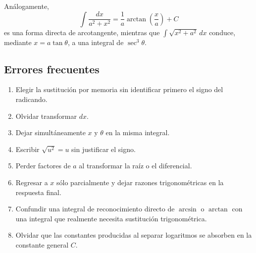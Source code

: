 \documentclass[12pt]{article}
\theoremstyle{definition}
\theoremstyle{remark}
\begin{document}
Análogamente,
\[
\int\frac{dx}{a^2+x^2}
=\frac1a\arctan\left(\frac{x}{a}\right)+C
\]
es una forma directa de arcotangente, mientras que $\int\sqrt{x^2+a^2}\,dx$ conduce, mediante $x=a\tan\theta$, a una integral de $\sec^3\theta$.

\subsection*{Errores frecuentes}

\begin{enumerate}
\item Elegir la sustitución por memoria sin identificar primero el signo del radicando.
\item Olvidar transformar $dx$.
\item Dejar simultáneamente $x$ y $\theta$ en la misma integral.
\item Escribir $\sqrt{u^2}=u$ sin justificar el signo.
\item Perder factores de $a$ al transformar la raíz o el diferencial.
\item Regresar a $x$ sólo parcialmente y dejar razones trigonométricas en la respuesta final.
\item Confundir una integral de reconocimiento directo de $\arcsin$ o $\arctan$ con una integral que realmente necesita sustitución trigonométrica.
\item Olvidar que las constantes producidas al separar logaritmos se absorben en la constante general $C$.
\end{enumerate}
\end{document}
